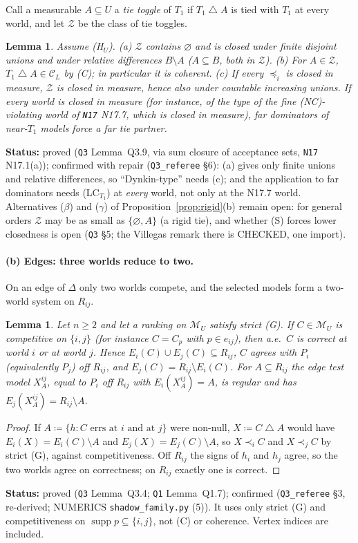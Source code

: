 \documentclass[11pt]{article}
\newtheorem{lemma}[theorem]{Lemma}
\theoremstyle{definition}
\theoremstyle{remark}
\newcommand{\M}{\mathcal M}
\newcommand{\C}{\mathcal C}
\newcommand{\supp}{\operatorname{supp}}
\newcommand{\sd}{\mathbin{\triangle}}
\newcommand{\src}[1]{\texttt{#1}}
\newcommand{\status}[1]{\par\smallskip\noindent\textbf{Status:} #1\par\smallskip}
\begin{document}
Call a measurable $A\subseteq U$ a \emph{tie toggle} of $T_1$ if $T_1\sd A$ is tied with $T_1$ at every world, and let $\mathcal Z$ be the class of tie toggles.

\begin{lemma}\label{lem:Q39}
Assume (H$_U$). (a) $\mathcal Z$ contains $\varnothing$ and is closed under finite disjoint unions and under relative differences $B\setminus A$ ($A\subseteq B$, both in $\mathcal Z$). (b) For $A\in\mathcal Z$, $T_1\sd A\in\C_L$ by (C); in particular it is coherent. (c) If every $\preceq_i$ is closed in measure, $\mathcal Z$ is closed in measure, hence also under countable increasing unions. If every world is closed in measure (for instance, of the type of the fine (NC)-violating world of \src{N17} N17.7, which is closed in measure), far dominators of near-$T_1$ models force a far tie partner.
\end{lemma}
\status{proved (\src{Q3} Lemma~Q3.9, via sum closure of acceptance sets, \src{N17} N17.1(a)); confirmed with repair (\src{Q3\_referee} \S6): (a) gives only finite unions and relative differences, so ``Dynkin-type'' needs (c); and the application to far dominators needs (LC$_{T_1}$) at \emph{every} world, not only at the N17.7 world. Alternatives ($\beta$) and ($\gamma$) of Proposition~\ref{prop:rigid}(b) remain open: for general orders $\mathcal Z$ may be as small as $\{\varnothing,A\}$ (a rigid tie), and whether (S) forces lower closedness is open (\src{Q3} \S5; the Villegas remark there is CHECKED, one import).}

\paragraph{(b) Edges: three worlds reduce to two.} On an edge of $\Delta$ only two worlds compete, and the selected models form a two-world system on $R_{ij}$.

\begin{lemma}\label{lem:Q34}
Let $n\ge2$ and let a ranking on $\M_U$ satisfy strict (G). If $C\in\M_U$ is competitive on $\{i,j\}$ (for instance $C=C_p$ with $p\in e_{ij}$), then a.e.\ $C$ is correct at world $i$ or at world $j$. Hence $E_i(C)\cup E_j(C)\subseteq R_{ij}$, $C$ agrees with $P_i$ (equivalently $P_j$) off $R_{ij}$, and $E_j(C)=R_{ij}\setminus E_i(C)$. For $A\subseteq R_{ij}$ the \emph{edge test model} $X^{ij}_A$, equal to $P_i$ off $R_{ij}$ with $E_i(X^{ij}_A)=A$, is regular and has $E_j(X^{ij}_A)=R_{ij}\setminus A$.
\end{lemma}
\begin{proof}
If $A\coloneqq\{h:\text{$C$ errs at $i$ and at $j$}\}$ were non-null, $X\coloneqq C\sd A$ would have $E_i(X)=E_i(C)\setminus A$ and $E_j(X)=E_j(C)\setminus A$, so $X\prec_iC$ and $X\prec_jC$ by strict (G), against competitiveness. Off $R_{ij}$ the signs of $h_i$ and $h_j$ agree, so the two worlds agree on correctness; on $R_{ij}$ exactly one is correct.
\end{proof}
\status{proved (\src{Q3} Lemma~Q3.4; \src{Q1} Lemma~Q1.7); confirmed (\src{Q3\_referee} \S3, re-derived; NUMERICS \src{shadow\_family.py} (5)). It uses only strict (G) and competitiveness on $\supp p\subseteq\{i,j\}$, not (C) or coherence. Vertex indices are included.}
\end{document}
